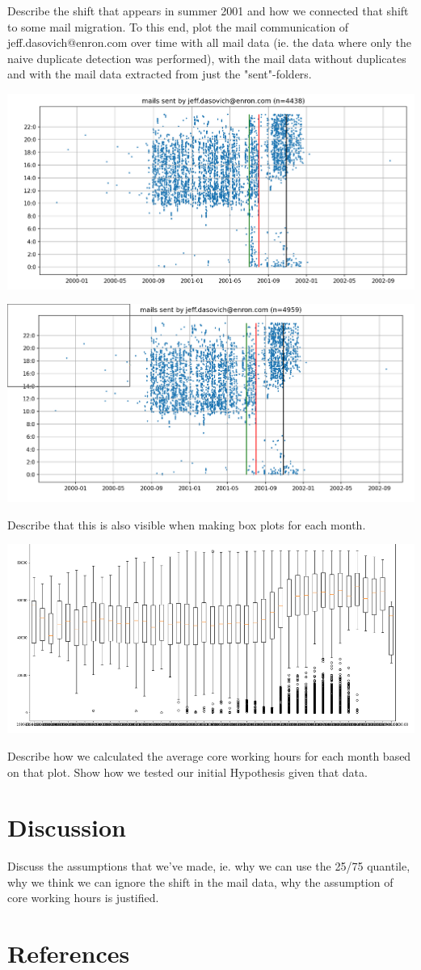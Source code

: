 \documentclass{article}
\begin{document}
Describe the shift that appears in summer 2001
and how we connected that shift to some mail migration. To this end, plot the
mail communication of jeff.dasovich@enron.com over time with all mail data (ie.
the data where only the naive duplicate detection was performed), with the mail
data without duplicates and with the mail data extracted from just the
"sent"-folders.

\begin{center}
  \includegraphics[width=0.7\linewidth]{tmp/plot_jeff_all.png}
\end{center}
\begin{center}
  \includegraphics[width=0.7\linewidth]{tmp/plot_jeff_stripped.png}
\end{center}

Describe that this is also visible when making box plots for each month.
\begin{center}
  \includegraphics[width=0.7\linewidth]{tmp/boxplot_all.png}
\end{center}

Describe how we calculated the average core working hours for each month based
on that plot. Show how we tested our initial Hypothesis given that data.

\section{Discussion}
Discuss the assumptions that we've made, ie. why we can use the 25/75 quantile,
why we think we can ignore the shift in the mail data, why the assumption of
core working hours is justified.

\section{References}
\end{document}
